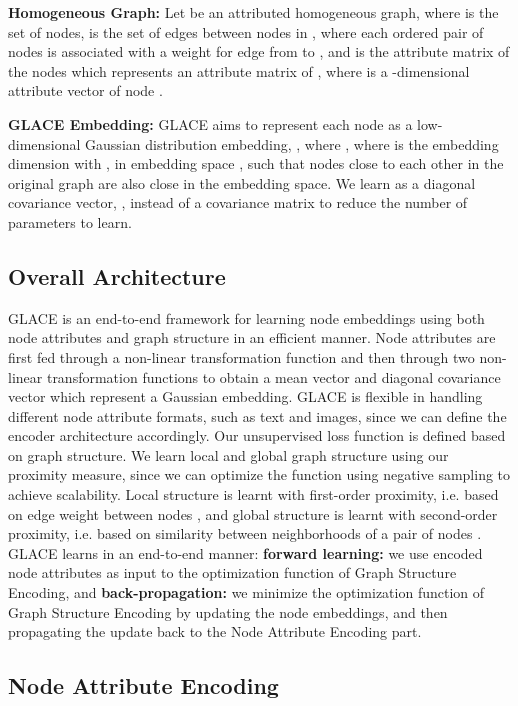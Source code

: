 \documentclass[runningheads]{llncs}
\begin{document}
\textbf{Homogeneous Graph:} Let  be an attributed homogeneous graph, where  is the set of nodes,  is the set of edges between nodes in , where each ordered pair of nodes  is associated with a weight  for edge from  to , and  is the attribute matrix of the nodes which represents an attribute matrix of , where  is a -dimensional attribute vector of node .

\noindent
\textbf{GLACE Embedding:} GLACE aims to represent each node  as a low-dimensional Gaussian distribution embedding, , where ,  where  is the embedding dimension with , in embedding space , such that nodes close to each other in the original graph are also close in the embedding space.
We learn  as a diagonal covariance vector, , instead of a covariance matrix to reduce the number of parameters to learn.

\subsection{Overall Architecture}

GLACE is an end-to-end framework for learning node embeddings using both node attributes and graph structure in an efficient manner. 
Node attributes are first fed through a non-linear transformation function and then through two non-linear transformation functions to obtain a mean vector and diagonal covariance vector which represent a Gaussian embedding. 
GLACE is flexible in handling different node attribute formats, such as text and images, since we can define the encoder architecture accordingly.
Our unsupervised loss function is defined based on graph structure. 
We learn local and global graph structure using our proximity measure, since we can optimize the function using negative sampling \cite{mikolov2013distributed} to achieve scalability.
Local structure is learnt with first-order proximity, i.e. based on edge weight between nodes \cite{DBLP:survey1}, and global structure is learnt with second-order proximity, i.e. based on similarity between neighborhoods of a pair of nodes \cite{DBLP:survey1}. 
GLACE learns in an end-to-end manner: 
\textbf{forward learning:} we use encoded node attributes as input to the optimization function of Graph Structure Encoding, and 
\textbf{back-propagation:} we minimize the optimization function of Graph Structure Encoding by updating the node embeddings, and then propagating the update back to the Node Attribute Encoding part.

\subsection{Node Attribute Encoding}
\label{sec:node_attr}
\end{document}

